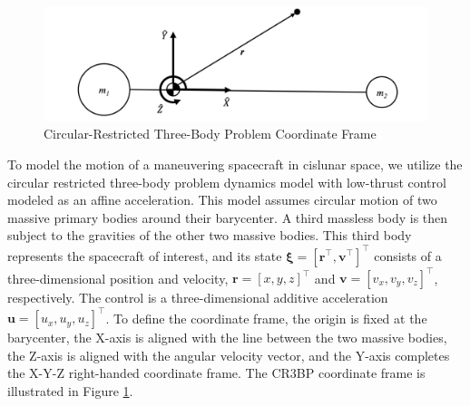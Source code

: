 \documentclass[letterpaper, preprint, paper,11pt]{AAS}	%
\begin{document}
\begin{figure}
    \centering
    \includegraphics[width=1\linewidth]{Figures/CR3BP.png}
    \caption{Circular-Restricted Three-Body Problem Coordinate Frame}
    \label{fig:CR3BP}
\end{figure}

To model the motion of a maneuvering spacecraft in cislunar space, we utilize the circular restricted three-body problem dynamics model with low-thrust control modeled as an affine acceleration. This model assumes circular motion of two massive primary bodies around their barycenter. A third massless body is then subject to the gravities of the other two massive bodies. This third body represents the spacecraft of interest, and its state $\bm{\xi} = [\bm{r}^\top, \bm{v}^\top]^\top$ consists of a three-dimensional position and velocity, $\bm{r} = [x, y, z]^\top$ and $\bm{v} = [v_x, v_y, v_z]^\top$, respectively. The control is a three-dimensional additive acceleration $\bm{u} = [u_x, u_y, u_z]^\top$. To define the coordinate frame, the origin is fixed at the barycenter, the X-axis is aligned with the line between the two massive bodies, the Z-axis is aligned with the angular velocity vector, and the Y-axis completes the X-Y-Z right-handed coordinate frame. The CR3BP coordinate frame is illustrated in Figure \ref{fig:CR3BP}. 
\end{document}
